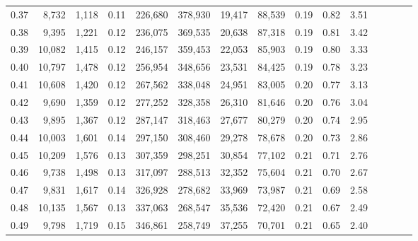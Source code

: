 \begin{tabular}{rrrcrrrrrrrrrrr}
0.37 &   8,732 &  1,118 &                                       0.11 &  226,680 &  378,930 &   19,417 &   88,539 &  0.19 &  0.82 &                         3.51 \\
0.38 &   9,395 &  1,221 &                                       0.12 &  236,075 &  369,535 &   20,638 &   87,318 &  0.19 &  0.81 &                         3.42 \\
0.39 &  10,082 &  1,415 &                                       0.12 &  246,157 &  359,453 &   22,053 &   85,903 &  0.19 &  0.80 &                         3.33 \\
0.40 &  10,797 &  1,478 &                                       0.12 &  256,954 &  348,656 &   23,531 &   84,425 &  0.19 &  0.78 &                         3.23 \\
0.41 &  10,608 &  1,420 &                                       0.12 &  267,562 &  338,048 &   24,951 &   83,005 &  0.20 &  0.77 &                         3.13 \\
0.42 &   9,690 &  1,359 &                                       0.12 &  277,252 &  328,358 &   26,310 &   81,646 &  0.20 &  0.76 &                         3.04 \\
0.43 &   9,895 &  1,367 &                                       0.12 &  287,147 &  318,463 &   27,677 &   80,279 &  0.20 &  0.74 &                         2.95 \\
0.44 &  10,003 &  1,601 &                                       0.14 &  297,150 &  308,460 &   29,278 &   78,678 &  0.20 &  0.73 &                         2.86 \\
0.45 &  10,209 &  1,576 &                                       0.13 &  307,359 &  298,251 &   30,854 &   77,102 &  0.21 &  0.71 &                         2.76 \\
0.46 &   9,738 &  1,498 &                                       0.13 &  317,097 &  288,513 &   32,352 &   75,604 &  0.21 &  0.70 &                         2.67 \\
0.47 &   9,831 &  1,617 &                                       0.14 &  326,928 &  278,682 &   33,969 &   73,987 &  0.21 &  0.69 &                         2.58 \\
0.48 &  10,135 &  1,567 &                                       0.13 &  337,063 &  268,547 &   35,536 &   72,420 &  0.21 &  0.67 &                         2.49 \\
0.49 &   9,798 &  1,719 &                                       0.15 &  346,861 &  258,749 &   37,255 &   70,701 &  0.21 &  0.65 &                         2.40 \\

\end{tabular}
